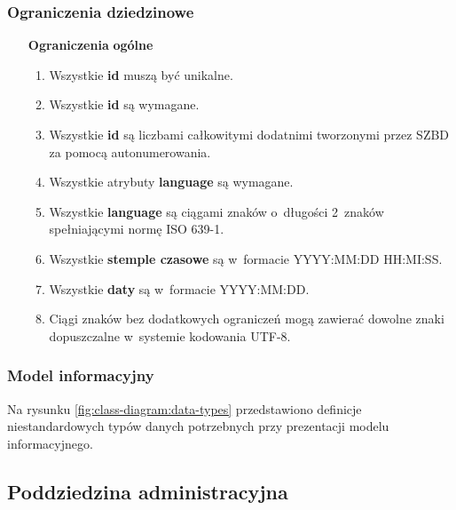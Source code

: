 \subsubsection{Ograniczenia dziedzinowe}\label{subsubsec:database:domain:restrictions}

\begin{itemize}[label={\textbf{Ograniczenia dla}}, wide, labelwidth=!, labelindent=0pt]
    \setlength\itemsep{1.75em}
    \item[\textbf{Ograniczenia}] \textbf{ogólne}
    \begin{enumerate}[label={\textbf{OGR/0/\protect\twodigits{\arabic{enumi}}}}, wide, labelwidth=!, align=left, leftmargin=3cm]
        \item Wszystkie \textbf{id} muszą być unikalne.
        \item Wszystkie \textbf{id} są wymagane.
        \item Wszystkie \textbf{id} są liczbami całkowitymi dodatnimi tworzonymi przez SZBD za pomocą autonumerowania.
        \item Wszystkie atrybuty \textbf{language} są wymagane.
        \item Wszystkie \textbf{language} są ciągami znaków o~długości 2~znaków spełniającymi normę ISO 639-1.
        \item Wszystkie \textbf{stemple czasowe} są w~formacie YYYY:MM:DD HH:MI:SS.
        \item Wszystkie \textbf{daty} są w~formacie YYYY:MM:DD.
        \item Ciągi znaków bez dodatkowych ograniczeń mogą zawierać dowolne znaki dopuszczalne w~systemie kodowania UTF-8.
    \end{enumerate}
\end{itemize}

\subsubsection{Model informacyjny}\label{subsubsec:database:domain:domainModel}
Na rysunku \ref{fig:class-diagram:data-types} przedstawiono definicje niestandardowych typów danych potrzebnych przy prezentacji modelu informacyjnego.


\subsection{Poddziedzina administracyjna}\label{subsec:database:gateway}

